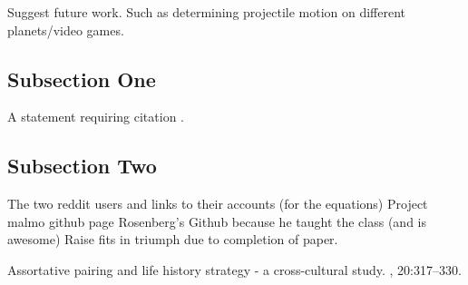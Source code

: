 \documentclass[twoside,twocolumn]{article}
\begin{document}
Suggest future work. Such as determining projectile motion on different planets/video games.

\subsection{Subsection One}

A statement requiring citation \cite{Figueredo:2009dg}.
\blindtext %

\subsection{Subsection Two}

\blindtext %


\begin{thebibliography}{99} %

The two reddit users and links to their accounts (for the equations)
Project malmo github page
Rosenberg's Github because he taught the class (and is awesome)
Raise fits in triumph due to completion of paper.

\newblock Assortative pairing and life history strategy - a cross-cultural
  study.
, 20:317--330.
 
\end{thebibliography}

\end{document}
